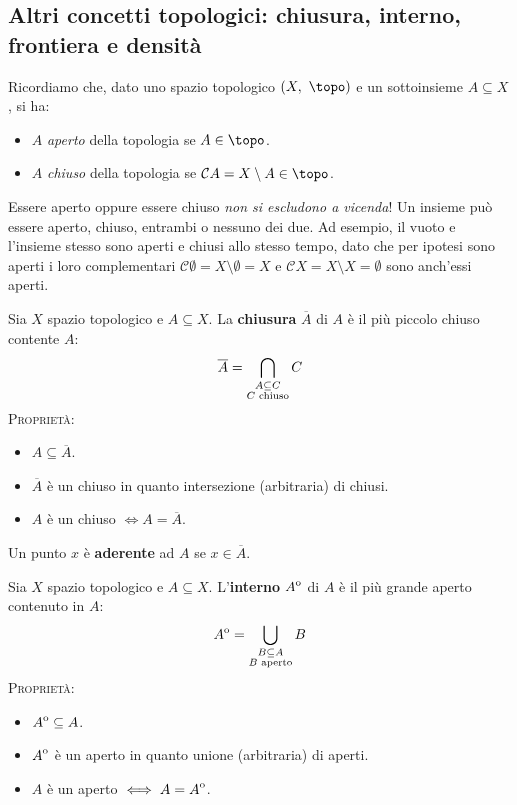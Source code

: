 \subsection{Altri concetti topologici: chiusura, interno, frontiera e densità}
Ricordiamo che, dato uno spazio topologico $\left(X,\ \topo\right)$ e un sottoinsieme $A\subseteq X$, si ha:
\begin{itemize}
	\item $A$ \textit{aperto} della topologia se $A\in\topo$.
	\item $A$ \textit{chiuso} della topologia se $\mathcal{C}A=X\setminus A\in\topo$.
\end{itemize}
\begin{attention}
	Essere aperto oppure essere chiuso \textit{non si escludono a vicenda}! Un insieme può essere aperto, chiuso, entrambi o nessuno dei due. Ad esempio, il vuoto e l'insieme stesso sono aperti e chiusi allo stesso tempo, dato che per ipotesi sono aperti i loro complementari $\mathcal{C}\emptyset = X\setminus \emptyset = X$ e $\mathcal{C}X = X\setminus X = \emptyset$ sono anch'essi aperti.
\end{attention}
\begin{define}
	Sia $X$ spazio topologico e $A\subseteq X$. La \textbf{chiusura} $\overline{A}$ di $A$ è il più piccolo chiuso contente $A$:
	\begin{equation}
		\overline{A}=\mathop{{\bigcap}}\displaylimits_{\substack{A\subseteq C\\ C\text{ chiuso}}}C
	\end{equation}
	\textsc{Proprietà:}
	\begin{itemize}
		\item $A\subseteq \overline{A}$.
		\item $\overline{A}$ è un chiuso in quanto intersezione (arbitraria) di chiusi.
		\item $A$ è un chiuso $\iff A=\overline{A}$.
	\end{itemize}
\end{define}
\begin{define}
	Un punto $x$ è \textbf{aderente} ad $A$ se $x\in\overline{A}$.
\end{define}
\begin{define}
	Sia $X$ spazio topologico e $A\subseteq X$. L'\textbf{interno} ${\kern0ptA}^{\mathrm{o}}$ di $A$ è il più grande aperto contenuto in $A$:
	\begin{equation}
		{\kern0ptA}^{\mathrm{o}}=\mathop{{\bigcup}}\displaylimits_{\substack{B\subseteq A\\ B\text{ aperto}}}B
	\end{equation}
	\textsc{Proprietà:}
	\begin{itemize}
		\item ${\kern0ptA}^{\mathrm{o}}\subseteq A$.
		\item ${\kern0ptA}^{\mathrm{o}}$ è un aperto in quanto unione (arbitraria) di aperti.
		\item $A$ è un aperto $\iff A={\kern0ptA}^{\mathrm{o}}$.
	\end{itemize}
\end{define}
